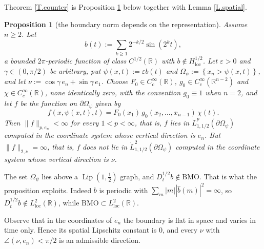 \documentclass[10pt,a4paper]{amsart}
\numberwithin{equation}{section}
\DeclareMathOperator{\Lip}{Lip}
\DeclareMathOperator{\loc}{loc}
\newcommand{\R}{\mathbb R}
\newcommand{\wh}{\widehat}
\newcommand{\abs}[1]{\left\vert#1\right\vert}
\newcommand{\br}[1]{\left(#1\right)}
\newcommand{\set}[1]{\left\{#1\right\}}
\newcommand{\om}{\Omega}
\newcommand{\pd}{\partial}
\newcommand{\dhalf}{D_t^{1/2}}
\newcommand{\BMO}{\mathrm{BMO}}
\newtheorem{proposition}[equation]{Proposition}
\begin{document}
\noindent Theorem \ref{T.counter} is Proposition \ref{P.counter} below
together with Lemma \ref{L.spatial}.

\begin{proposition}[the boundary norm depends on the representation]\label{P.counter}
Assume $n\ge2$. Let
\[
  b(t):=\sum_{k\ge1}2^{-k/2}\sin(2^{k}t) ,
\]
a bounded $2\pi$-periodic function of class $C^{1/2}(\R)$ with
$b\notin H^{1/2}_{\loc}$. Let $\varepsilon>0$ and $\gamma\in(0,\pi/2)$ be arbitrary,
put $\psi(x,t):=\varepsilon b(t)$ and $\om_\psi:=\set{x_n>\psi(x,t)}$, and let
$\nu:=\cos\gamma\,e_n+\sin\gamma\,e_1$. Choose
$F_0\in C_c^\infty(\R)$, $g_0\in C_c^\infty(\R^{n-2})$ and
$\chi\in C_c^\infty(\R)$, none identically zero, with the convention
$g_0\equiv1$ when $n=2$, and let $f$ be the
function on $\pd\om_\psi$ given by
\[
  f\br{x,\psi(x,t),t}=F_0(x_1)\,g_0(x_2,\dots,x_{n-1})\,\chi(t) .
\]
Then $\|f\|_{p,e_n}<\infty$ for every $1<p<\infty$, that is, $f$ lies in
$\dot L^p_{1,1/2}(\pd\om_\psi)$ computed in the coordinate system whose
vertical direction is $e_n$. But $\|f\|_{2,\nu}=\infty$, that is, $f$ does not
lie in $\dot L^2_{1,1/2}(\pd\om_\psi)$ computed in the coordinate system whose
vertical direction is $\nu$.
\end{proposition}

The set $\om_\psi$ lies above a $\Lip(1,\tfrac12)$ graph, and
$\dhalf b\notin\BMO$. That is what the proposition exploits. Indeed $b$ is
periodic with $\sum_m\abs m\abs{\wh b(m)}^2=\infty$, so
$\dhalf b\notin L^2_{\loc}(\R)$, while $\BMO\subset L^2_{\loc}(\R)$.

Observe that in the coordinates of $e_n$ the boundary is flat in space and
varies in time only. Hence its spatial Lipschitz constant is $0$, and every
$\nu$ with $\angle(\nu,e_n)<\pi/2$ is an admissible direction.
\end{document}
